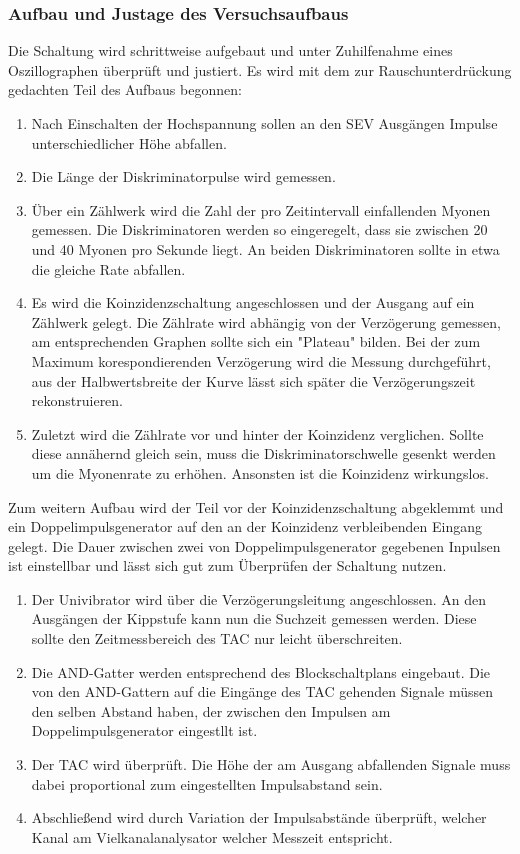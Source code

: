   \subsubsection{Aufbau und Justage des Versuchsaufbaus}
  Die Schaltung wird schrittweise aufgebaut und unter Zuhilfenahme eines Oszillographen
  überprüft und justiert. Es wird mit dem zur Rauschunterdrückung gedachten
  Teil des Aufbaus begonnen:
  \begin{enumerate}
    \item Nach Einschalten der Hochspannung sollen an den SEV Ausgängen Impulse
    unterschiedlicher Höhe abfallen.
    \item Die Länge der Diskriminatorpulse wird gemessen.
    \item Über ein Zählwerk wird die Zahl der pro Zeitintervall einfallenden Myonen
    gemessen. Die Diskriminatoren werden so eingeregelt, dass sie zwischen 20 und 40
    Myonen pro Sekunde liegt. An beiden Diskriminatoren sollte in etwa die gleiche
    Rate abfallen.
    \item Es wird die Koinzidenzschaltung angeschlossen und der Ausgang auf ein
    Zählwerk gelegt. Die Zählrate wird abhängig von der Verzögerung gemessen, am
    entsprechenden Graphen sollte sich ein "Plateau" bilden. Bei der zum Maximum
    korespondierenden Verzögerung wird die Messung durchgeführt, aus der Halbwertsbreite
    der Kurve lässt sich später die Verzögerungszeit rekonstruieren.
    \item Zuletzt wird die Zählrate vor und hinter der Koinzidenz verglichen. Sollte
    diese annähernd gleich sein, muss die Diskriminatorschwelle gesenkt werden um die
    Myonenrate zu erhöhen. Ansonsten ist die Koinzidenz wirkungslos.
  \end{enumerate}
  Zum weitern Aufbau wird der Teil vor der Koinzidenzschaltung abgeklemmt und ein
  Doppelimpulsgenerator auf den an der Koinzidenz verbleibenden Eingang gelegt.
  Die Dauer zwischen zwei von Doppelimpulsgenerator gegebenen Inpulsen ist einstellbar
  und lässt sich gut zum Überprüfen der Schaltung nutzen.
  \begin{enumerate}
    \item Der Univibrator wird über die Verzögerungsleitung angeschlossen. An den
    Ausgängen der Kippstufe kann nun die Suchzeit gemessen werden. Diese sollte den
    Zeitmessbereich des TAC nur leicht überschreiten.
    \item Die AND-Gatter werden entsprechend des Blockschaltplans eingebaut. Die von
    den AND-Gattern auf die Eingänge des TAC gehenden Signale müssen den selben Abstand
    haben, der zwischen den Impulsen am Doppelimpulsgenerator eingestllt ist.
    \item Der TAC wird überprüft. Die Höhe der am Ausgang abfallenden Signale muss
    dabei proportional zum eingestellten Impulsabstand sein.
    \item Abschließend wird durch Variation der Impulsabstände überprüft, welcher Kanal
    am Vielkanalanalysator welcher Messzeit entspricht.
  \end{enumerate}
